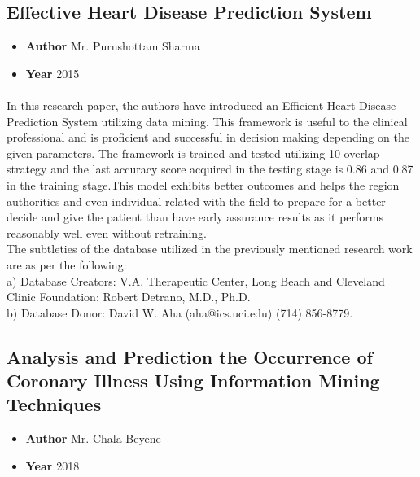 \documentclass[oneside,12pt]{Classes/VTU}
\begin{document}
    \subsection{Effective Heart Disease Prediction System}
    \begin{itemize}
    	\item \textbf{Author} Mr. Purushottam Sharma
    	\item \textbf{Year} 2015
    \end{itemize}
	\paragraph{}
    In this research paper, the authors have introduced an Efficient Heart Disease Prediction System utilizing data mining. This framework is useful to the clinical professional and is proficient and successful in decision making depending on the given parameters. The framework is trained and tested utilizing 10 overlap strategy and the last accuracy score acquired in the testing stage is 0.86 and 0.87 in the training stage.This model exhibits better outcomes and helps the region authorities and even individual related with the field to prepare for a better decide and give the patient than have early assurance results as it performs reasonably well even without retraining.
    \\
    The subtleties of the database utilized in the previously mentioned research work are as per the following:
    \\
    	a) Database Creators: V.A. Therapeutic Center, Long Beach and Cleveland Clinic Foundation: Robert Detrano, M.D., Ph.D.
    	\\
    	b) Database Donor: David W. Aha (aha@ics.uci.edu) (714) 856-8779.
    \subsection{Analysis and Prediction the Occurrence of Coronary Illness Using Information Mining Techniques}
    \begin{itemize}
    	\item \textbf{Author} Mr. Chala Beyene
    	\item \textbf{Year} 2018
    \end{itemize}
\end{document}
